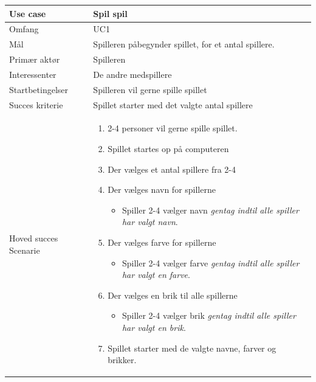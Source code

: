 \begin{center}
\begin{longtable}{ |l|p{10.7cm}|} 
 \hline
 Use case  & Spil spil \\ 
 \hline
 Omfang & UC1 \\ 
 \hline
 Mål & Spilleren påbegynder spillet, for et antal spillere. \\ 
 \hline
  Primær aktør & Spilleren \\ 
 \hline
  Interessenter & De andre medspillere \\ 
 \hline
  Startbetingelser  & Spilleren vil gerne spille spillet \\ 
 \hline
  Succes kriterie & Spillet starter med det valgte antal spillere \\ 
 \hline
  Hoved succes Scenarie & 
  
  \begin{minipage}[t]{1\textwidth}
  \begin{enumerate}
      \item 2-4 personer vil gerne spille spillet.
      \item Spillet startes op på computeren
      \item Der vælges et antal spillere fra 2-4
      \item Der vælges navn for spillerne
      \begin{itemize}
          \item Spiller 2-4 vælger navn 
          \newline
          \emph{gentag indtil alle spiller har valgt navn}.
      \end{itemize}
      \item Der vælges farve for spillerne
      \begin{itemize}
          \item Spiller 2-4 vælger farve 
          \newline
          \emph{gentag indtil alle spiller har valgt en farve}.
      \end{itemize}
      \item Der vælges en brik til alle spillerne
      \begin{itemize}
          \item Spiller 2-4 vælger brik 
          \newline
          \emph{gentag indtil alle spiller har valgt en brik}.
      \end{itemize}
      \item Spillet starter med de valgte navne, farver og brikker.
  \end{enumerate} 

\end{minipage}
\end{longtable}
\end{center}
